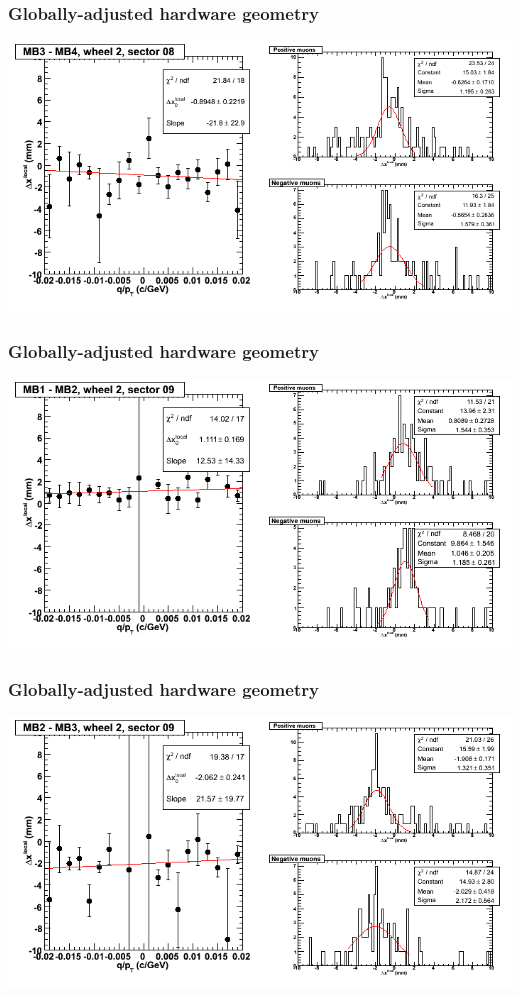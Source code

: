 \documentclass[compress]{beamer}
\begin{document}
\begin{frame}
\frametitle{Globally-adjusted hardware geometry}
\includegraphics[width=\linewidth]{NOV4_segdiffs_HW/dt13_resid_E_08_34.png}
\end{frame}

\begin{frame}
\frametitle{Globally-adjusted hardware geometry}
\includegraphics[width=\linewidth]{NOV4_segdiffs_HW/dt13_resid_E_09_12.png}
\end{frame}

\begin{frame}
\frametitle{Globally-adjusted hardware geometry}
\includegraphics[width=\linewidth]{NOV4_segdiffs_HW/dt13_resid_E_09_23.png}
\end{frame}
\end{document}
